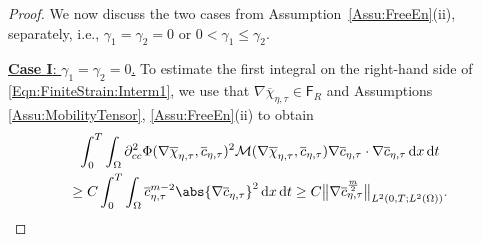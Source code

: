 \documentclass[a4paper,12pt]{article}
\newcommand{\calM}{\mathcal{M}}
\newcommand{\pl}{\partial}
\newcommand{\dx}{\mathrm{\,d}x}
\newcommand{\dt}{\mathrm{\,d}t}
\newcommand{\chibar}{\overline{\chi}}
\newcommand{\cbar}{\overline{c}}
\theoremstyle{plain}
\theoremstyle{definition}
\numberwithin{equation}{section}
\begin{document}
\begin{proof}
    We now discuss the two cases from Assumption~\ref{Assu:FreeEn}(ii), separately, 
    i.e., $\gamma_1=\gamma_2=0$ or $0<\gamma_1\leq \gamma_2$.
    
    \underline{\textbf{Case I}: $\gamma_1=\gamma_2=0$.} 
To estimate the first integral on the right-hand side of \eqref{Eqn:FiniteStrain:Interm1}, we use that $\nabla\chibar_{\eta,\tau} \in \mathsf{F}_R$ and Assumptions \ref{Assu:MobilityTensor}, \ref{Assu:FreeEn}(ii) to obtain
    \begin{multline}
    \int_0^T\int_\Omega  \pl^2_{cc}\Phi(\nabla\chibar_{\eta,\tau},\cbar_{\eta,\tau})^2\calM(\nabla\chibar_{\eta,\tau},\cbar_{\eta,\tau})\nabla \cbar_{\eta,\tau}\cdot\nabla \cbar_{\eta,\tau} \dx\dt \\\geq C\int_0^T\int_\Omega \cbar_{\eta,\tau}^{m-2} \abs{\nabla \cbar_{\eta,\tau}}^2\dx\dt
    \geq C\big\|{\nabla \cbar_{\eta,\tau}^{\frac{m}{2}}}\big\|_{L^2(0,T;L^2(\Omega))} .
    \label{Eqn:FiniteStrain:Interm2}
    \end{multline}


\end{proof}
\end{document}
